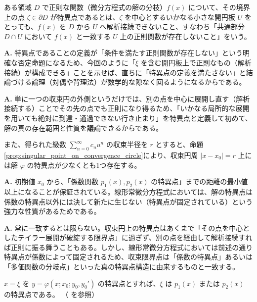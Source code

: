 \begin{definition}[解析関数の特異点の厳密な定義]\label{def:singular_point_strict}
    ある領域 $D$ で正則な関数（微分方程式の解の分枝）$f(x)$ について、その境界上の点 $\zeta \in \partial D$ が特異点であるとは、$\zeta$ を中心とするいかなる小さな開円板 $U$ をとっても、$f(x)$ を $D$ から $U$ へ解析接続できないこと、すなわち「共通部分 $D \cap U$ において $f(x)$ と一致する $U$ 上の正則関数が存在しないこと」をいう。
\end{definition}

\begin{Q}
\textbf{A.} 特異点であることの定義が「条件を満たす正則関数が存在しない」という明確な否定命題になるため、今回のように「$\xi$ を含む開円板上で正則なもの（解析接続）が構成できる」ことを示せば、直ちに「特異点の定義を満たさない」と結論づける論理（対偶や背理法）が数学的な隙なく回るようになるからである。
\end{Q}

\begin{Q}
\textbf{A.} 単に一つの収束円の外側というだけでは、別の点を中心に展開し直す（解析接続する）ことでその先の点でも正則になり得るため、「いかなる局所的な展開を用いても絶対に到達・通過できない行き止まり」を特異点と定義して初めて、解の真の存在範囲と性質を議論できるからである。
\end{Q}

また、得られた級数 $\sum_{n=0}^{\infty} c_{n} u^{n}$ の収束半径を $r$ とすると、命題\ref{prop:singular_point_on_convergence_circle}により、収束円周 $|x-x_0|=r$ 上には解 $\varphi$ の特異点が少なくとも1つ存在する。

\begin{Q}
\textbf{A.} 初期値 $x_0$ から、「係数関数 $p_1(x), p_2(x)$ の特異点」までの距離の最小値以上になることが保証されている。線形常微分方程式においては、解の特異点は係数の特異点以外には決して新たに生じない（特異点が固定されている）という強力な性質があるためである。
\end{Q}

\begin{Q}
\textbf{A.} 常に一致するとは限らない。収束円上の特異点はあくまで「その点を中心としたテイラー展開が破綻する限界点」に過ぎず、別の点を経由して解析接続すれば正則に振る舞うこともある。しかし、線形常微分方程式においては前述の通り特異点が係数によって固定されるため、収束限界点は「係数の特異点」あるいは「多価関数の分岐点」といった真の特異点構造に由来するものと一致する。
\end{Q}
\begin{proposition}\label{prop:linear_ode_singularities_fixed}
    $x=\xi$ を $y=\varphi(x;x_{0};y_{0},y_{0}')$ の特異点とすれば、$\xi$ は $p_{1}(x)$ または $p_{2}(x)$ の特異点である。
    （\cite[p.50 命題2.1]{book:okamoto} を参照）
\end{proposition}

